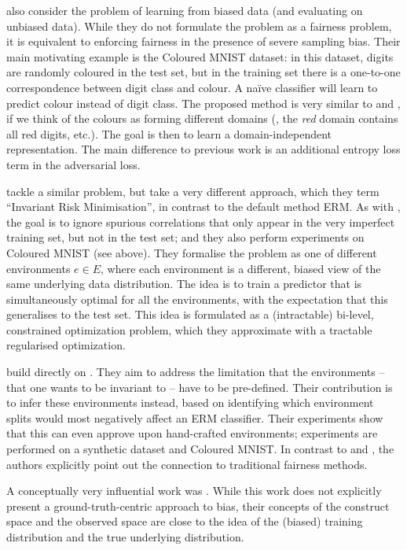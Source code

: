 \citet{kim2019learning} also consider the problem of learning from biased data (and evaluating on unbiased data).
While they do not formulate the problem as a fairness problem,
it is equivalent to enforcing fairness in the presence of severe sampling bias.
Their main motivating example is the Coloured MNIST dataset:
in this dataset, digits are randomly coloured in the test set,
but in the training set there is a one-to-one correspondence between digit class and colour.
A na\"ive classifier will learn to predict colour instead of digit class.
The proposed method is very similar to \citet{ganin2016domain} and \citet{edwards2016censoring},
if we think of the colours as forming different domains
(\ie, the \emph{red} domain contains all red digits, etc.).
The goal is then to learn a domain-independent representation.
The main difference to previous work is an additional entropy loss term in the adversarial loss.

\citet{arjovsky2019invariant} tackle a similar problem, but take a very different approach,
which they term ``Invariant Risk Minimisation'', in contrast to the default method \acf{ERM}.
As with \citet{kim2019learning},
the goal is to ignore spurious correlations that only appear in the very imperfect training set,
but not in the test set;
and they also perform experiments on Coloured MNIST (see above).
They formalise the problem as one of different environments $e\in E$,
where each environment is a different, biased view of the same underlying data distribution.
The idea is to train a predictor that is simultaneously optimal for all the environments,
with the expectation that this generalises to the test set.
This idea is formulated as a (intractable) bi-level, constrained optimization problem,
which they approximate with a tractable regularised optimization.

\citet{creager2020environment} build directly on \citet{arjovsky2019invariant}.
They aim to address the limitation that the environments -- that one wants to be invariant to -- have to be pre-defined.
Their contribution is to infer these environments instead,
based on identifying which environment splits would most negatively affect an \ac{ERM} classifier.
Their experiments show that this can even approve upon hand-crafted environments;
experiments are performed on a synthetic dataset and Coloured MNIST.
In contrast to \citet{kim2019learning} and \citet{arjovsky2019invariant},
the authors explicitly point out the connection to traditional fairness methods.

A conceptually very influential work was \citet{friedler2016possibility}.
While this work does not explicitly present a ground-truth-centric approach to bias,
their concepts of the construct space and the observed space are close
to the idea of the (biased) training distribution and the true underlying distribution.

